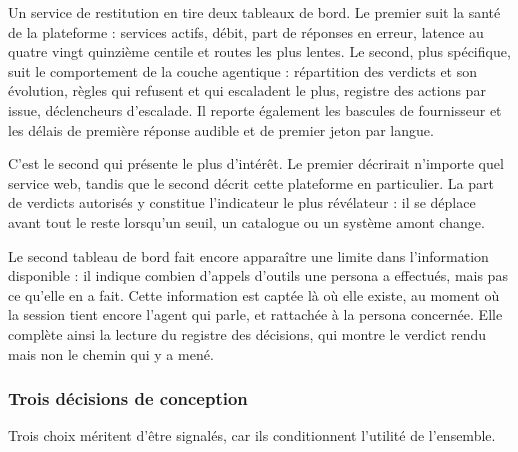 Un service de restitution en tire deux tableaux de bord. Le premier suit la santé de la plateforme : services actifs, débit, part de réponses en erreur, latence au quatre vingt quinzième centile et routes les plus lentes. Le second, plus spécifique, suit le comportement de la couche agentique : répartition des verdicts et son évolution, règles qui refusent et qui escaladent le plus, registre des actions par issue, déclencheurs d'escalade. Il reporte également les bascules de fournisseur et les délais de première réponse audible et de premier jeton par langue.

C'est le second qui présente le plus d'intérêt. Le premier décrirait n'importe quel service web, tandis que le second décrit cette plateforme en particulier. La part de verdicts autorisés y constitue l'indicateur le plus révélateur : il se déplace avant tout le reste lorsqu'un seuil, un catalogue ou un système amont change.

Le second tableau de bord fait encore apparaître une limite dans l'information disponible : il indique combien d'appels d'outils une persona a effectués, mais pas ce qu'elle en a fait. Cette information est captée là où elle existe, au moment où la session tient encore l'agent qui parle, et rattachée à la persona concernée. Elle complète ainsi la lecture du registre des décisions, qui montre le verdict rendu mais non le chemin qui y a mené.

\subsubsection{Trois décisions de conception}

Trois choix méritent d'être signalés, car ils conditionnent l'utilité de l'ensemble.

